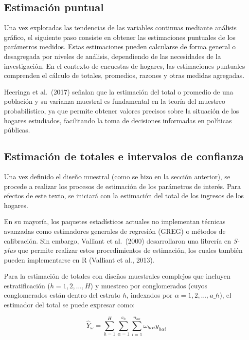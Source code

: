 \documentclass[
  spanish,
  12pt,
]{book}
\begin{document}
\subsection{Estimación puntual}\label{estimaciuxf3n-puntual}

Una vez exploradas las tendencias de las variables continuas mediante análisis gráfico, el siguiente paso consiste en obtener las estimaciones puntuales de los parámetros medidos. Estas estimaciones pueden calcularse de forma general o desagregada por niveles de análisis, dependiendo de las necesidades de la investigación. En el contexto de encuestas de hogares, las estimaciones puntuales comprenden el cálculo de totales, promedios, razones y otras medidas agregadas.

Heeringa et al.~(2017) señalan que la estimación del total o promedio de una población y su varianza muestral es fundamental en la teoría del muestreo probabilístico, ya que permite obtener valores precisos sobre la situación de los hogares estudiados, facilitando la toma de decisiones informadas en políticas públicas.

\subsection{Estimación de totales e intervalos de confianza}\label{estimaciuxf3n-de-totales-e-intervalos-de-confianza}

Una vez definido el diseño muestral (como se hizo en la sección anterior), se procede a realizar los procesos de estimación de los parámetros de interés. Para efectos de este texto, se iniciará con la estimación del total de los ingresos de los hogares.

En su mayoría, los paquetes estadísticos actuales no implementan técnicas avanzadas como estimadores generales de regresión (GREG) o métodos de calibración. Sin embargo, Valliant et al.~(2000) desarrollaron una librería en \emph{S-plus} que permite realizar estos procedimientos de estimación, los cuales también pueden implementarse en R (Valliant et al., 2013).

Para la estimación de totales con diseños muestrales complejos que incluyen estratificación (\(h=1,2,...,H\)) y muestreo por conglomerados (cuyos conglomerados están dentro del estrato \(h\), indexados por \(\alpha=1,2,...,a\_h\)), el estimador del total se puede expresar como:

\[
\hat{Y}_{\omega} = \sum_{h=1}^{H}\sum_{\alpha=1}^{a_h}\sum_{i=1}^{n_{h\alpha}}\omega_{h\alpha i} y_{h\alpha i}
\]
\end{document}
